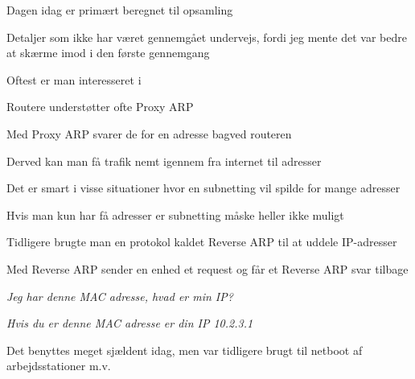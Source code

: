 





\begin{list1}
\item Dagen idag er primært beregnet til opsamling
\item Detaljer som ikke har været gennemgået undervejs, fordi jeg mente det var bedre at skærme imod i den første gennemgang

\end{list1}



\centerline{Oftest er man interesseret i }


\begin{list1}
\item Routere understøtter ofte Proxy ARP
\item Med Proxy ARP svarer de for en adresse bagved routeren
\item Derved kan man få trafik nemt igennem fra internet til adresser
\item Det er smart i visse situationer hvor en subnetting vil spilde for mange adresser
\item Hvis man kun har få adresser er subnetting måske heller ikke muligt
\item {}
\end{list1}


\begin{list1}
\item Tidligere brugte man en protokol kaldet Reverse ARP til at uddele IP-adresser
\item Med Reverse ARP sender en enhed et request og får et Reverse ARP svar tilbage
\item \emph{Jeg har denne MAC adresse, hvad er min IP?}
\item \emph{Hvis du er denne MAC adresse er din IP 10.2.3.1}
\item Det benyttes meget sjældent idag, men var tidligere brugt til netboot af arbejdsstationer m.v.
\end{list1}


